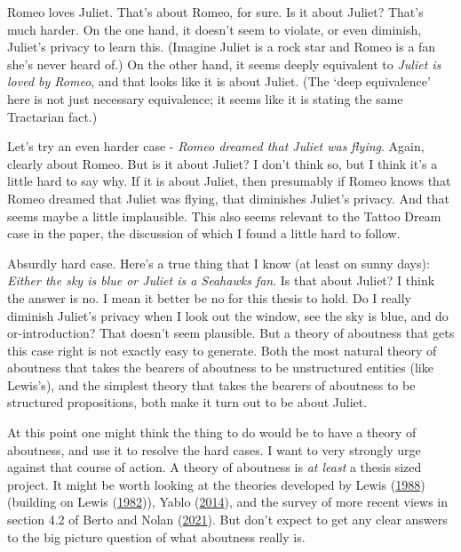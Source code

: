 \documentclass[
  letterpaper,
  DIV=11,
  numbers=noendperiod]{scrartcl}
\begin{document}
Romeo loves Juliet. That's about Romeo, for sure. Is it about Juliet?
That's much harder. On the one hand, it doesn't seem to violate, or even
diminish, Juliet's privacy to learn this. (Imagine Juliet is a rock star
and Romeo is a fan she's never heard of.) On the other hand, it seems
deeply equivalent to \emph{Juliet is loved by Romeo}, and that looks
like it is about Juliet. (The `deep equivalence' here is not just
necessary equivalence; it seems like it is stating the same Tractarian
fact.)

Let's try an even harder case - \emph{Romeo dreamed that Juliet was
flying}. Again, clearly about Romeo. But is it about Juliet? I don't
think so, but I think it's a little hard to say why. If it is about
Juliet, then presumably if Romeo knows that Romeo dreamed that Juliet
was flying, that diminishes Juliet's privacy. And that seems maybe a
little implausible. This also seems relevant to the Tattoo Dream case in
the paper, the discussion of which I found a little hard to follow.

Absurdly hard case. Here's a true thing that I know (at least on sunny
days): \emph{Either the sky is blue or Juliet is a Seahawks fan}. Is
that about Juliet? I think the answer is no. I mean it better be no for
this thesis to hold. Do I really diminish Juliet's privacy when I look
out the window, see the sky is blue, and do or-introduction? That
doesn't seem plausible. But a theory of aboutness that gets this case
right is not exactly easy to generate. Both the most natural theory of
aboutness that takes the bearers of aboutness to be unstructured
entities (like Lewis's), and the simplest theory that takes the bearers
of aboutness to be structured propositions, both make it turn out to be
about Juliet.

At this point one might think the thing to do would be to have a theory
of aboutness, and use it to resolve the hard cases. I want to very
strongly urge against that course of action. A theory of aboutness is
\emph{at least} a thesis sized project. It might be worth looking at the
theories developed by Lewis (\protect\hyperlink{ref-Lewis1988e}{1988})
(building on Lewis (\protect\hyperlink{ref-Lewis1982c}{1982})), Yablo
(\protect\hyperlink{ref-Yablo2014-YABA}{2014}), and the survey of more
recent views in section 4.2 of Berto and Nolan
(\protect\hyperlink{ref-sep-hyperintensionality}{2021}). But don't
expect to get any clear answers to the big picture question of what
aboutness really is.
\end{document}
